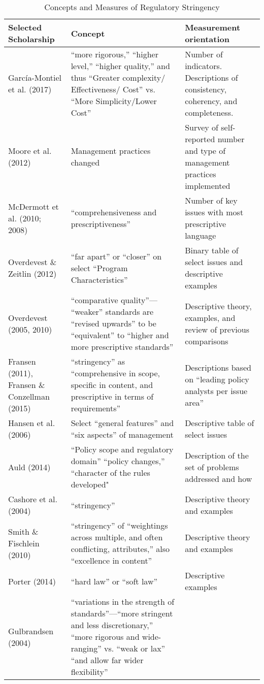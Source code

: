 \begin{table}
\caption{Concepts and Measures of Regulatory Stringency}
\label{review}
\footnotesize

\begin{tabular}{p{3.7cm}p{7.5cm}p{5cm}}
Selected Scholarship & Concept &	Measurement orientation \\
\hline
García-Montiel et al. (2017)&
“more rigorous,” “higher level,” “higher quality,” and thus “Greater complexity/ Effectiveness/ Cost” vs. “More Simplicity/Lower Cost”&
Number of indicators. Descriptions of consistency, coherency, and completeness.\\
\hline
Moore et al. (2012)&
Management practices changed &	
Survey of self-reported number and type of management practices implemented\\
\hline
McDermott et al. (2010; 2008)&
“comprehensiveness and prescriptiveness”&
Number of key issues with most prescriptive language\\
\hline
Overdevest \& Zeitlin (2012)&
“far apart” or “closer” on select “Program Characteristics”&
Binary table of select issues and descriptive examples\\
\hline
Overdevest (2005, 2010)&
“comparative quality”— “weaker” standards are “revised upwards” to be “equivalent” to “higher and more prescriptive standards”&
Descriptive theory, examples, and review of previous comparisons\\
\hline
Fransen (2011), Fransen \& Conzellman (2015)&
“stringency” as “comprehensive in scope, specific in content, and prescriptive in terms of requirements”&
Descriptions based on “leading policy analysts per issue area”\\
\hline
Hansen et al. (2006)&
Select “general features” and “six aspects” of management &
Descriptive table of select issues\\
\hline
Auld (2014)&	
“Policy scope and regulatory domain” “policy changes,” “character of the rules developed"&
Description of the set of problems addressed and how\\
\hline
Cashore et al. (2004)&	
“stringency”&
Descriptive theory and examples\\
\hline
Smith \& Fischlein (2010)&
 “stringency” of “weightings across multiple, and often conflicting, attributes,” also “excellence in content”&
Descriptive theory and examples\\
\hline
Porter (2014)&
“hard law” or “soft law”&
Descriptive examples\\
\hline
Gulbrandsen (2004)&
“variations in the strength of standards”—“more stringent and less discretionary,” “more rigorous and wide-ranging” vs. “weak or lax” “and allow far wider flexibility”

\end{tabular}
\end{table}
